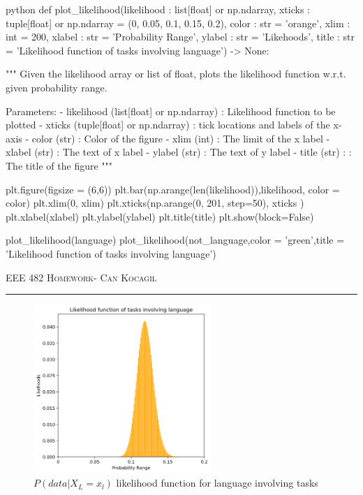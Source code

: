 \documentclass[12pt]{amsart}
\begin{document}
\begin{mintedbox}{python}
def plot_likelihood(likelihood : list[float] or np.ndarray,
                    xticks : tuple[float] or np.ndarray = (0, 0.05, 0.1, 0.15, 0.2),
                    color : str = 'orange',
                    xlim : int = 200,                     
                    xlabel : str = 'Probability Range',
                    ylabel : str = 'Likehoods',
                    title : str = 'Likelihood function of tasks involving language') -> None:

    """
    Given the likelihood array or list of float, plots the likelihood function w.r.t. given probability range.

        Parameters:
            - likelihood (list[float] or np.ndarray) : Likelihood function to be plotted
            - xticks (tuple[float] or np.ndarray)    : tick locations and labels of the x-axis
            - color (str)                            : Color of the figure
            - xlim (int)                             : The limit of the x label
            - xlabel (str)                           : The text of x label
            - ylabel (str)                           : The text of y label
            - title (str) :                          : The title of the figure
    """
    
    plt.figure(figsize = (6,6))
    plt.bar(np.arange(len(likelihood)),likelihood, color = color)    
    plt.xlim(0, xlim)
    plt.xticks(np.arange(0, 201, step=50), xticks )
    plt.xlabel(xlabel)
    plt.ylabel(ylabel)
    plt.title(title)
    plt.show(block=False)

plot_likelihood(language)
plot_likelihood(not_language,color = 'green',title = 'Likelihood function of tasks involving language')

\end{mintedbox}
\newpage
{\scshape EEE 482} \hfill {\scshape \large  Homework-\relax} \hfill {\scshape Can Kocagil}
\smallskip
\hrule

\begin{figure}[h]
\centering
\includegraphics[width = 0.6\textwidth]{images/1.png}
\caption{$P (data|X_L= x_l)$  likelihood function for language involving tasks }
\end{figure}
\end{document}
